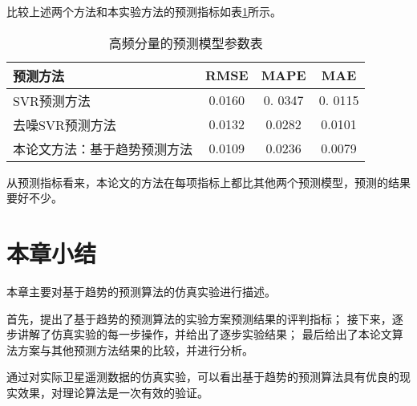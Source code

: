 比较上述两个方法和本实验方法的预测指标如表\ref{tab:fangfa_comp}所示。
\begin{table}[htbp] 
	\centering
	\caption{\label{tab:fangfa_comp}高频分量的预测模型参数表} 
	\begin{tabular}{lccc} 
		\toprule 
		预测方法 & RMSE & MAPE & MAE \\ 
		\midrule
		SVR预测方法 & 0.0160 & 0. 0347 & 0. 0115 \\ 
		去噪SVR预测方法 & 0.0132 & 0.0282 & 0.0101 \\ 
		本论文方法：基于趋势预测方法 & 0.0109 & 0.0236 & 0.0079 \\ 
		\bottomrule 
	\end{tabular} 
\end{table}

从预测指标看来，本论文的方法在每项指标上都比其他两个预测模型，预测的结果要好不少。
\section{本章小结}
本章主要对基于趋势的预测算法的仿真实验进行描述。

首先，提出了基于趋势的预测算法的实验方案预测结果的评判指标；
接下来，逐步讲解了仿真实验的每一步操作，并给出了逐步实验结果；
最后给出了本论文算法方案与其他预测方法结果的比较，并进行分析。

通过对实际卫星遥测数据的仿真实验，可以看出基于趋势的预测算法具有优良的现实效果，对理论算法是一次有效的验证。